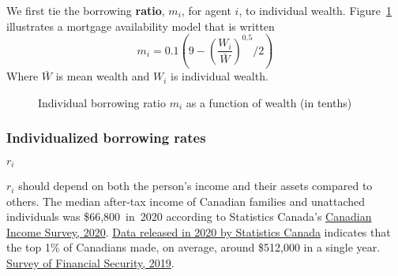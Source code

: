 We first tie the borrowing \textbf{ratio}, $m_i$,  for agent $i$, to individual wealth. Figure~\ref{Fig:Borrowingratio} illustrates a mortgage availability  model that is written 
 \[ m_i = 0.1(9-\left(\frac{W_i}{\bar W}\right)^{0.5}/2 )\]
Where $\bar{W}$ is mean wealth and $W_i$ is individual wealth. 

\begin{figure}[htb]
\caption{Individual borrowing ratio $m_i$ as a function of wealth (in tenths)}
 \label{Fig:Borrowingratio}
\end{figure}


\subsubsection{Individualized borrowing rates}\label{SS:BorowingRate}
 $r_i$ 
 
 $r_i$ should depend on  both the person's income and their assets compared to others. The median after-tax income of Canadian families and unattached individuals was \$66,800 in 2020 according to Statistics Canada's \href{https://www150.statcan.gc.ca/n1/daily-quotidien/220323/dq220323a-eng.htm}{Canadian Income Survey, 2020}.  \href{https://www150.statcan.gc.ca/t1/tbl1/en/tv.action?pid=1110005501}{Data released in 2020 by Statistics Canada} indicates that the top 1\% of Canadians made, on average, around \$512,000 in a single year. \href{https://www150.statcan.gc.ca/n1/daily-quotidien/201222/dq201222b-eng.htm}{Survey of Financial Security, 2019}.

